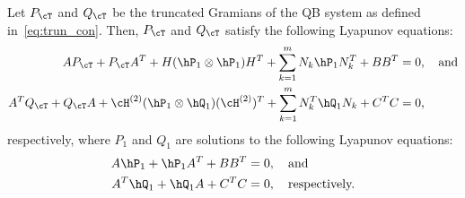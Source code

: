 \begin{corollary}\label{coro:tru_gram}
Let  $P_\cT$ and $Q_\cT$ be the truncated Gramians of the QB system as defined in~\eqref{eq:trun_con}. Then, $P_\cT$ and $Q_\cT$ satisfy the following Lyapunov equations:
\begin{subequations}\label{eq:tru_gramians}
\begin{align}
AP_\cT+P_\cT A^T + H(\hP_1\otimes \hP_1)H^T  + \sum_{k=1}^mN_k\hP_1N_k^T + BB^T  &=0,\quad \mbox{and}\\
A^TQ_\cT+Q_\cT A +  \cH^{(2)}(\hP_1\otimes \hQ_1)(\cH^{(2)})^T+ \sum_{k=1}^m N_k^T\hQ_1N_k + C^TC &=0, \label{eq:tru_obs_Gram}
\end{align}
\end{subequations}
respectively, where $P_1$ and $Q_1$ are  solutions to the following Lyapunov equations:
\begin{align}
A\hP_1+\hP_1 A^T + BB^T &=0,\quad\mbox{and}\label{eq:linear_CG}\\
A^T\hQ_1+\hQ_1 A + C^TC &=0,\quad\text{respectively.}\label{eq:linear_OG}
\end{align}
\end{corollary}
